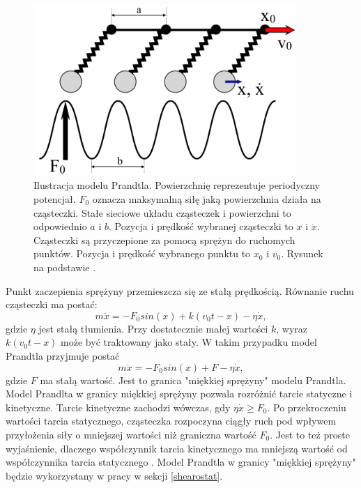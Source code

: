 \documentclass[12pt,a4paper,openright]{report} %
\begin{document}
\begin{figure}[h!]
\centering
\includegraphics[width=10cm, clip]{rysunki/PTmodel.pdf}
\caption{Ilustracja modelu Prandtla. Powierzchnię reprezentuje periodyczny potencjał. $F_0$ oznacza maksymalną siłę jaką powierzchnia działa na cząsteczki. Stałe sieciowe układu cząsteczek i powierzchni to odpowiednio $a$ i $b$. Pozycja i prędkość wybranej cząsteczki to $x$ i $\dot{x}$. Cząsteczki są przyczepione za pomocą sprężyn do ruchomych punktów. Pozycja i prędkość wybranego punktu to $x_0$ i $v_0$. Rysunek na podstawie \cite{SpringerHandbook}.}
\label{PTmodel}
\end{figure}
Punkt zaczepienia sprężyny przemieszcza się ze stałą prędkością. Równanie ruchu cząsteczki ma postać:
\begin{equation}
m\ddot{x}=-F_0 sin(x) + k(v_0 t - x)-\eta \dot{x},
\end{equation}
gdzie $\eta$ jest stałą tłumienia. Przy dostatecznie małej wartości $k$, wyraz $k(v_0 t -x)$ może być traktowany jako stały. W takim przypadku model Prandtla przyjmuje postać
\begin{equation}
m\ddot{x}=-F_0 sin(x) + F -\eta \dot{x},
\end{equation}
gdzie $F$ ma stałą wartość. Jest to granica "miękkiej sprężyny" modelu Prandtla. Model Prandlta w granicy miękkiej sprężyny pozwala rozróżnić tarcie statyczne i kinetyczne. Tarcie kinetyczne zachodzi wówczas, gdy $\eta \dot{x} \geqslant F_0$. Po przekroczeniu wartości tarcia statycznego, cząsteczka rozpoczyna ciągły ruch pod wpływem przyłożenia siły o mniejszej wartości niż graniczna wartość $F_0$. Jest to też proste wyjaśnienie, dlaczego współczynnik tarcia kinetycznego ma mniejszą wartość od współczynnika tarcia statycznego \cite{Popov2014}. Model Prandtla w granicy "miękkiej sprężyny" będzie wykorzystany w pracy w sekcji \ref{shearostat}.
\\
\\
\end{document}
